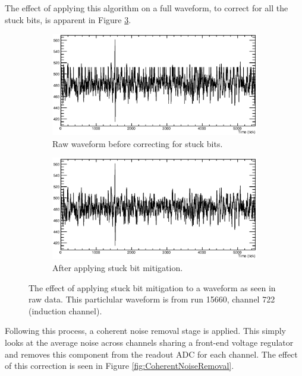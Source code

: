 The effect of applying this algorithm on a full waveform, to correct for all the stuck bits, is apparent in Figure \ref{fig:StuckBitWaveform}.

\begin{figure}[ht]
  \centering
  \begin{subfigure}[t]{0.48\linewidth}
    \centering
    \includegraphics[width=\textwidth]{raw_stuck.eps}
    \caption{Raw waveform before correcting for stuck bits.}
    \label{fig:StuckBitWaveformStuck}
  \end{subfigure}
  \hfill
  \begin{subfigure}[t]{0.48\linewidth}
    \centering
    \includegraphics[width=\textwidth]{raw_unstuck.eps}
    \caption{After applying stuck bit mitigation.}
    \label{fig:StuckBitWaveformUnstuck}
  \end{subfigure}
  \caption[Raw data stuck bit mitigation]{The effect of applying stuck bit mitigation to a waveform as seen in raw data.  This particlular waveform is from run 15660, channel 722 (induction channel).}
  \label{fig:StuckBitWaveform}
\end{figure}

Following this process, a coherent noise removal stage is applied.  This simply looks at the average noise across channels sharing a front-end voltage regulator and removes this component from the readout ADC for each channel.  The effect of this correction is seen in Figure \ref{fig:CoherentNoiseRemoval}.

